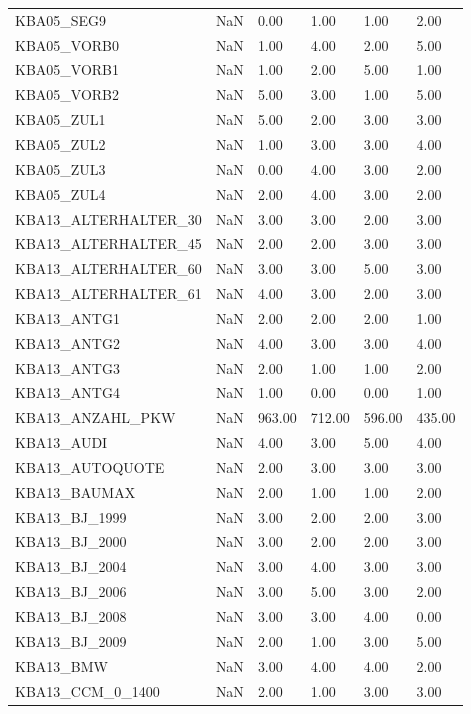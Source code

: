 \begin{longtable}{lp{1cm}p{1cm}p{1cm}p{1cm}p{1cm}}
KBA05\_SEG9 & NaN & 0.00 & 1.00 & 1.00 & 2.00 \\
KBA05\_VORB0 & NaN & 1.00 & 4.00 & 2.00 & 5.00 \\
KBA05\_VORB1 & NaN & 1.00 & 2.00 & 5.00 & 1.00 \\
KBA05\_VORB2 & NaN & 5.00 & 3.00 & 1.00 & 5.00 \\
KBA05\_ZUL1 & NaN & 5.00 & 2.00 & 3.00 & 3.00 \\
KBA05\_ZUL2 & NaN & 1.00 & 3.00 & 3.00 & 4.00 \\
KBA05\_ZUL3 & NaN & 0.00 & 4.00 & 3.00 & 2.00 \\
KBA05\_ZUL4 & NaN & 2.00 & 4.00 & 3.00 & 2.00 \\
KBA13\_ALTERHALTER\_30 & NaN & 3.00 & 3.00 & 2.00 & 3.00 \\
KBA13\_ALTERHALTER\_45 & NaN & 2.00 & 2.00 & 3.00 & 3.00 \\
KBA13\_ALTERHALTER\_60 & NaN & 3.00 & 3.00 & 5.00 & 3.00 \\
KBA13\_ALTERHALTER\_61 & NaN & 4.00 & 3.00 & 2.00 & 3.00 \\
KBA13\_ANTG1 & NaN & 2.00 & 2.00 & 2.00 & 1.00 \\
KBA13\_ANTG2 & NaN & 4.00 & 3.00 & 3.00 & 4.00 \\
KBA13\_ANTG3 & NaN & 2.00 & 1.00 & 1.00 & 2.00 \\
KBA13\_ANTG4 & NaN & 1.00 & 0.00 & 0.00 & 1.00 \\
KBA13\_ANZAHL\_PKW   & NaN &    963.00 &    712.00 &    596.00 &    435.00 \\
KBA13\_AUDI & NaN & 4.00 & 3.00 & 5.00 & 4.00 \\
KBA13\_AUTOQUOTE  & NaN & 2.00 & 3.00 & 3.00 & 3.00 \\
KBA13\_BAUMAX  & NaN & 2.00 & 1.00 & 1.00 & 2.00 \\
KBA13\_BJ\_1999    & NaN & 3.00 & 2.00 & 2.00 & 3.00 \\
KBA13\_BJ\_2000    & NaN & 3.00 & 2.00 & 2.00 & 3.00 \\
KBA13\_BJ\_2004    & NaN & 3.00 & 4.00 & 3.00 & 3.00 \\
KBA13\_BJ\_2006    & NaN & 3.00 & 5.00 & 3.00 & 2.00 \\
KBA13\_BJ\_2008    & NaN & 3.00 & 3.00 & 4.00 & 0.00 \\
KBA13\_BJ\_2009    & NaN & 2.00 & 1.00 & 3.00 & 5.00 \\
KBA13\_BMW & NaN & 3.00 & 4.00 & 4.00 & 2.00 \\
KBA13\_CCM\_0\_1400   & NaN & 2.00 & 1.00 & 3.00 & 3.00 \\

\end{longtable}
